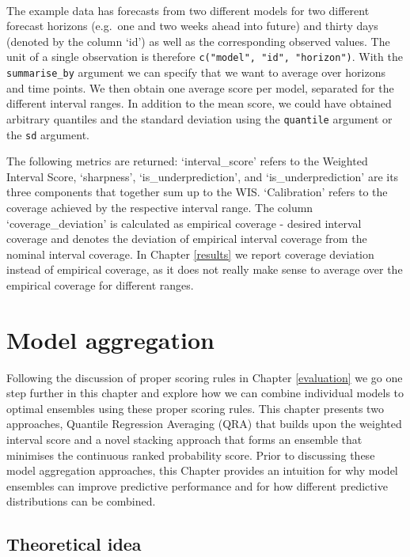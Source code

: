 \documentclass[
]{book}
\begin{document}
\(~\)

The example data has forecasts from two different models for two different forecast horizons (e.g.~one and two weeks ahead into future) and thirty days (denoted by the column `id') as well as the corresponding observed values. The unit of a single observation is therefore \texttt{c("model",\ "id",\ "horizon")}. With the \texttt{summarise\_by} argument we can specify that we want to average over horizons and time points. We then obtain one average score per model, separated for the different interval ranges. In addition to the mean score, we could have obtained arbitrary quantiles and the standard deviation using the \texttt{quantile} argument or the \texttt{sd} argument.

The following metrics are returned: `interval\_score' refers to the Weighted Interval Score, `sharpness', `is\_underprediction', and `is\_underprediction' are its three components that together sum up to the WIS. `Calibration' refers to the coverage achieved by the respective interval range. The column `coverage\_deviation' is calculated as empirical coverage - desired interval coverage and denotes the deviation of empirical interval coverage from the nominal interval coverage. In Chapter \ref{results} we report coverage deviation instead of empirical coverage, as it does not really make sense to average over the empirical coverage for different ranges.

\hypertarget{model-aggregation}{%
\chapter{Model aggregation}\label{model-aggregation}}

Following the discussion of proper scoring rules in Chapter \ref{evaluation} we go one step further in this chapter and explore how we can combine individual models to optimal ensembles using these proper scoring rules. This chapter presents two approaches, Quantile Regression Averaging (QRA) that builds upon the weighted interval score and a novel stacking approach that forms an ensemble that minimises the continuous ranked probability score. Prior to discussing these model aggregation approaches, this Chapter provides an intuition for why model ensembles can improve predictive performance and for how different predictive distributions can be combined.

\hypertarget{theoretical-idea}{%
\section{Theoretical idea}\label{theoretical-idea}}
\end{document}
